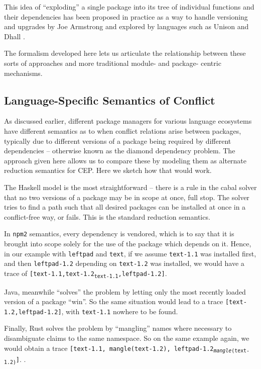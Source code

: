 \documentclass[hoptionsi,review,screen,format=sigconf]{acmart}
\theoremstyle{definition}
\begin{document}
This idea of ``exploding'' a single package into its tree of individual functions and their dependencies has been proposed in practice as a way to handle versioning and upgrades by Joe Armstrong \cite{armstrong}
and explored by languages such as Unison and Dhall \cite{unison, dhall}.

The formalism developed here lets us articulate the relationship between these sorts of approaches and more traditional module- and package- centric mechanisms.

\subsection{Language-Specific Semantics of Conflict}
As discussed earlier, different package managers for various language ecosystems have different semantics as to when conflict relations arise between packages, typically due to different versions of a package being required by different dependencies -- otherwise known as the diamond dependency problem. The approach given here allows us to compare these by modeling them as alternate reduction semantics for CEP. Here we sketch how that would work.

 The Haskell model is the most straightforward -- there is a rule in the cabal solver that no two versions of a package may be in scope at once, full stop. The solver tries to find a path such that all desired packages can be installed at once in a conflict-free way, or fails. This is the standard reduction semantics.

In \texttt{npm2} semantics, every dependency is vendored, which is to say that it is brought into scope solely for the use of the package which depends on it. \cite{npmworks} Hence, in our example with \texttt{leftpad} and \texttt{text}, if we assume \texttt{text-1.1} was installed first, and then \texttt{leftpad-1.2} depending on \texttt{text-1.2} was installed, we would have a trace of \texttt{[text-1.1,text-1.2\textsubscript{text-1.1},leftpad-1.2]}. 

Java, meanwhile ``solves'' the problem by letting only the most recently loaded version of a package ``win''. So the same situation would lead to a trace \texttt{[text-1.2,leftpad-1.2]}, with \texttt{text-1.1} nowhere to be found. 

Finally, Rust solves the problem by ``mangling'' names where necessary to disambiguate claims to the same namespace. So on the same example again, we would obtain a trace \texttt{[text-1.1, mangle(text-1.2), leftpad-1.2\textsubscript{\textit{mangle}(text-1.2)}]}. \cite{rusthell}.
\end{document}
